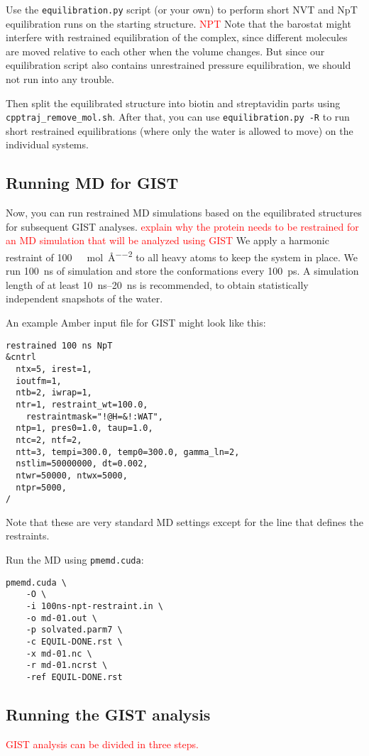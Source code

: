 \documentclass[9pt,tutorial]{livecoms}
\newcommand{\software}{\texttt}
\newcommand{\todo}{\textcolor{red}}
\begin{document}
Use the \software{equilibration.py} script (or your own) to perform short NVT and NpT equilibration runs on the starting structure.
\todo {NPT}
Note that the barostat might interfere with restrained equilibration of the complex, since different molecules are moved relative to each other when the volume changes.
But since our equilibration script also contains unrestrained pressure equilibration, we should not run into any trouble.

Then split the equilibrated structure into biotin and streptavidin parts using \software{cpptraj\_remove\_mol.sh}.
After that, you can use \software{equilibration.py -R} to run short restrained equilibrations (where only the water is allowed to move) on the individual systems.

\subsection{Running MD for GIST}

Now, you can run restrained MD simulations based on the equilibrated structures for subsequent GIST analyses.
\todo {explain why the protein needs to be restrained for an MD simulation that will be analyzed using GIST}
We apply a harmonic restraint of \SI{100}{\kilo\calorie\per\mole\per\angstrom\squared} to all heavy atoms to keep the system in place.
We run \SI{100}{\nano\second} of simulation and store the conformations every \SI{100}{\pico\second}.
A simulation length of at least \SIrange{10}{20}{\nano\second} is recommended, to obtain statistically independent snapshots of the water.

An example Amber input file for GIST might look like this:
\begin{lstlisting}
restrained 100 ns NpT
&cntrl
  ntx=5, irest=1,
  ioutfm=1,
  ntb=2, iwrap=1,
  ntr=1, restraint_wt=100.0,
    restraintmask="!@H=&!:WAT",
  ntp=1, pres0=1.0, taup=1.0,
  ntc=2, ntf=2,
  ntt=3, tempi=300.0, temp0=300.0, gamma_ln=2,
  nstlim=50000000, dt=0.002,
  ntwr=50000, ntwx=5000,
  ntpr=5000,
/
\end{lstlisting}
Note that these are very standard MD settings except for the line that defines the restraints.

Run the MD using \software{pmemd.cuda}:
\begin{lstlisting}
pmemd.cuda \
	-O \
	-i 100ns-npt-restraint.in \
	-o md-01.out \
	-p solvated.parm7 \
	-c EQUIL-DONE.rst \
	-x md-01.nc \
	-r md-01.ncrst \
	-ref EQUIL-DONE.rst
\end{lstlisting}
\subsection{Running the GIST analysis}
\todo{GIST analysis can be divided in three steps.
\cite{Ramsey2016}}
\end{document}

